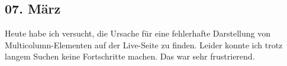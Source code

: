 \subsection{07. März}
Heute habe ich versucht, die Ursache für eine fehlerhafte Darstellung von Multicolumn-Elementen auf der Live-Seite zu finden. Leider konnte ich trotz langem Suchen keine Fortschritte machen. Das war sehr frustrierend.